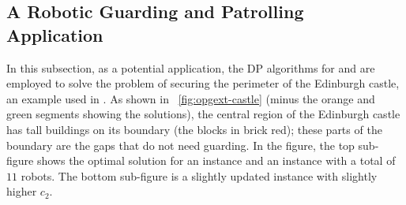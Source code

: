 \subsection{A Robotic Guarding and Patrolling Application}
In this subsection, as a potential application, the DP algorithms for 
\opglr and \opgmc are employed to solve the problem of securing the 
perimeter of the Edinburgh castle, an example used in 
\cite{fenghangaoyu2019efficient}. As shown in ~\ref{fig:opgext-castle} (minus 
the orange and green segments showing the solutions), the central 
region of the Edinburgh castle has tall buildings on its boundary 
(the blocks in brick red); these parts of the boundary are the gaps 
that do not need guarding. In the figure, the top sub-figure shows 
the optimal solution for an \opglr instance and an \opgmc instance with 
a total of $11$ robots. The bottom sub-figure is a slightly updated 
\opgmc instance with slightly higher $c_2$. 
